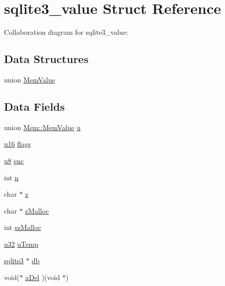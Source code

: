 \hypertarget{struct_mem}{}\section{sqlite3\+\_\+value Struct Reference}
\label{struct_mem}


Collaboration diagram for sqlite3\+\_\+value\+:
\subsection*{Data Structures}
\begin{DoxyCompactItemize}
\item 
union \hyperlink{union_mem_1_1_mem_value}{Mem\+Value}
\end{DoxyCompactItemize}
\subsection*{Data Fields}
\begin{DoxyCompactItemize}
\item 
union \hyperlink{union_mem_1_1_mem_value}{Mem\+::\+Mem\+Value} \hyperlink{struct_mem_a7ec4547fa6cefb081c68a98628fe43ac}{u}
\item 
\hyperlink{sqlite3_8c_a20f2299e322dcbde37cb07b16910b843}{u16} \hyperlink{struct_mem_a687c73b55452210faa467db4d365a3ee}{flags}
\item 
\hyperlink{sqlite3_8c_a74a0f6424ae628af25f23f0a35f6ead3}{u8} \hyperlink{struct_mem_a9c71ab1f0d39a2b088a6d8a1093159c0}{enc}
\item 
int \hyperlink{struct_mem_a76f11d9a0a47b94f72c2d0e77fb32240}{n}
\item 
char $\ast$ \hyperlink{struct_mem_a99c0cc44b073a87d419d090571f773a5}{z}
\item 
char $\ast$ \hyperlink{struct_mem_a61cff46330bc94e3750512be20335341}{z\+Malloc}
\item 
int \hyperlink{struct_mem_a56d1abb60aeee5af56cbe04752733cd3}{sz\+Malloc}
\item 
\hyperlink{sqlite3_8c_a03ad5adfaeb9b7640dde78a0cc390319}{u32} \hyperlink{struct_mem_a95b9bece3b8200fe5d56d20aa4c6ea94}{u\+Temp}
\item 
\hyperlink{structsqlite3}{sqlite3} $\ast$ \hyperlink{struct_mem_ad6e663497d2c934364b3bcf07496b30b}{db}
\item 
void($\ast$ \hyperlink{struct_mem_ad2185e5192b0df27c6a55ba9b65c94c2}{x\+Del} )(void $\ast$)
\end{DoxyCompactItemize}



